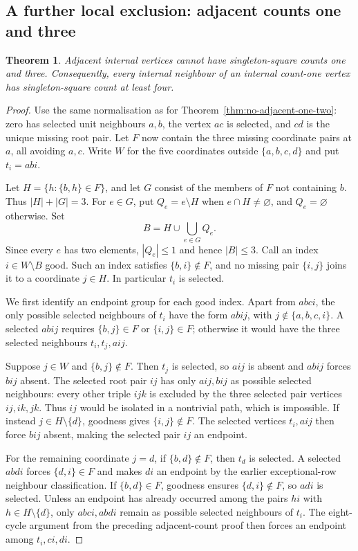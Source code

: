 \documentclass[11pt,a4paper]{article}
\newtheorem{theorem}{Theorem}[section]
\theoremstyle{definition}
\theoremstyle{remark}
\begin{document}
\subsection{A further local exclusion: adjacent counts one and three}
\begin{theorem}\label{thm:no-adjacent-one-three}
Adjacent internal vertices cannot have singleton-square counts one and three. Consequently, every internal neighbour of an internal count-one vertex has singleton-square count at least four.
\end{theorem}
\begin{proof}
Use the same normalisation as for Theorem~\ref{thm:no-adjacent-one-two}: zero has selected unit neighbours $a,b$, the vertex $ac$ is selected, and $cd$ is the unique missing root pair. Let $F$ now contain the three missing coordinate pairs at $a$, all avoiding $a,c$. Write $W$ for the five coordinates outside $\{a,b,c,d\}$ and put $t_i=abi$.

Let $H=\{h:\{b,h\}\in F\}$, and let $G$ consist of the members of $F$ not containing $b$. Thus $|H|+|G|=3$. For $e\in G$, put $Q_e=e\setminus H$ when $e\cap H\ne\varnothing$, and $Q_e=\varnothing$ otherwise. Set
\[
B=H\cup\bigcup_{e\in G}Q_e.
\]
Since every $e$ has two elements, $|Q_e|\le1$ and hence $|B|\le3$. Call an index $i\in W\setminus B$ good. Such an index satisfies $\{b,i\}\notin F$, and no missing pair $\{i,j\}$ joins it to a coordinate $j\in H$. In particular $t_i$ is selected.

We first identify an endpoint group for each good index. Apart from $abci$, the only possible selected neighbours of $t_i$ have the form $abij$, with $j\notin\{a,b,c,i\}$. A selected $abij$ requires $\{b,j\}\in F$ or $\{i,j\}\in F$; otherwise it would have the three selected neighbours $t_i,t_j,aij$.

Suppose $j\in W$ and $\{b,j\}\notin F$. Then $t_j$ is selected, so $aij$ is absent and $abij$ forces $bij$ absent. The selected root pair $ij$ has only $aij,bij$ as possible selected neighbours: every other triple $ijk$ is excluded by the three selected pair vertices $ij,ik,jk$. Thus $ij$ would be isolated in a nontrivial path, which is impossible. If instead $j\in H\setminus\{d\}$, goodness gives $\{i,j\}\notin F$. The selected vertices $t_i,aij$ then force $bij$ absent, making the selected pair $ij$ an endpoint.

For the remaining coordinate $j=d$, if $\{b,d\}\notin F$, then $t_d$ is selected. A selected $abdi$ forces $\{d,i\}\in F$ and makes $di$ an endpoint by the earlier exceptional-row neighbour classification. If $\{b,d\}\in F$, goodness ensures $\{d,i\}\notin F$, so $adi$ is selected. Unless an endpoint has already occurred among the pairs $hi$ with $h\in H\setminus\{d\}$, only $abci,abdi$ remain as possible selected neighbours of $t_i$. The eight-cycle argument from the preceding adjacent-count proof then forces an endpoint among $t_i,ci,di$.


\end{proof}
\end{document}
